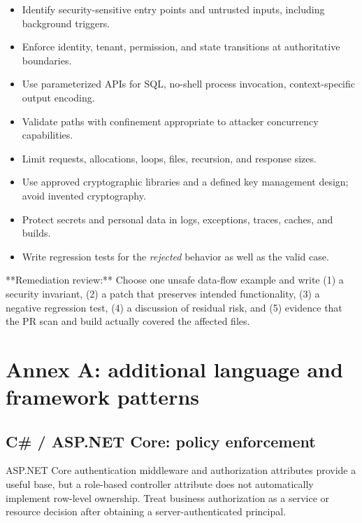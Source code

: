 \documentclass[
  letterpaper,
]{article}
\providecommand{\tightlist}{%
  \setlength{\itemsep}{0pt}\setlength{\parskip}{0pt}}
\begin{document}
\begin{itemize}
\tightlist
\item
  Identify security-sensitive entry points and untrusted inputs,
  including background triggers.
\item
  Enforce identity, tenant, permission, and state transitions at
  authoritative boundaries.
\item
  Use parameterized APIs for SQL, no-shell process invocation,
  context-specific output encoding.
\item
  Validate paths with confinement appropriate to attacker concurrency
  capabilities.
\item
  Limit requests, allocations, loops, files, recursion, and response
  sizes.
\item
  Use approved cryptographic libraries and a defined key management
  design; avoid invented cryptography.
\item
  Protect secrets and personal data in logs, exceptions, traces, caches,
  and builds.
\item
  Write regression tests for the \emph{rejected} behavior as well as the
  valid case.
\end{itemize}

\begin{fieldwork}
**Remediation review:** Choose one unsafe data-flow example and write (1) a security invariant, (2) a patch that preserves intended functionality, (3) a negative regression test, (4) a discussion of residual risk, and (5) evidence that the PR scan and build actually covered the affected files.
\end{fieldwork}

\section{Annex A: additional language and framework
patterns}\label{annex-a-additional-language-and-framework-patterns}

\subsection{C\# / ASP.NET Core: policy
enforcement}\label{c-asp.net-core-policy-enforcement}

ASP.NET Core authentication middleware and authorization attributes
provide a useful base, but a role-based controller attribute does not
automatically implement row-level ownership. Treat business
authorization as a service or resource decision after obtaining a
server-authenticated principal.
\end{document}
